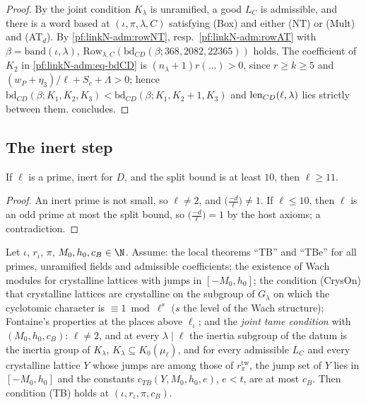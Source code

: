 \begin{proof}
By the joint condition $K_\lambda$ is unramified, a good $L_C$ is admissible, and there is a word based at
$(\iota,\pi,\lambda,C)$ satisfying (Box) and either (NT) or (Mult) and
(AT$_d$). By \cref{pf:linkN-adm:rowNT}, resp.\ \cref{pf:linkN-adm:rowAT} with
$\beta=\mathrm{band}(\iota,\lambda)$, $\mathrm{Row}_{\lambda,C}(\mathrm{bd}_{CD}(\beta;368,2082,22365))$ holds. The coefficient of
$K_2$ in \eqref{pf:linkN-adm:eq-bdCD} is $(n_\lambda+1)r(\dots)>0$, since $r\ge k\ge5$ and $(w_P+\eta_3)/\ell+S_c+\Lambda>0$;
hence $\mathrm{bd}_{CD}(\beta;K_1,K_2,K_3)<\mathrm{bd}_{CD}(\beta;K_1,K_2+1,K_3)$ and $\operatorname{len}_{CD}(\ell,\lambda)$ lies
strictly between them.  concludes.
\end{proof}

\subsection{The inert step}\label{pf:linkN-adm:inertsec}

\begin{lemma}\label{pf:linkN-adm:eleven}
If $\ell$ is a prime, inert for $D$, and the split bound is at least $10$, then $\ell\ge11$.
\end{lemma}

\begin{proof}
An inert prime is not small, so $\ell\ne2$, and $\bigl(\frac{-d}{\ell}\bigr)\ne1$. If $\ell\le10$, then $\ell$ is an odd
prime at most the split bound, so $\bigl(\frac{-d}{\ell}\bigr)=1$ by the host axioms; a contradiction.
\end{proof}

\begin{lemma}\label{pf:linkN-adm:TB}
Let $\iota$, $r_\iota$, $\pi$, $M_0,h_0,c_B\in\N$. Assume: the local theorems ``TB'' and ``TBe'' for all primes, unramified
fields and admissible coefficients; the existence of Wach modules for crystalline
lattices with jumps in $[-M_0,h_0]$; the condition (CrysOn) that crystalline lattices are crystalline on the subgroup of $G_\lambda$ on which the cyclotomic character is $\equiv1\bmod\ell^s$ ($s$ the level of the Wach structure); Fontaine's properties at
the places above $\ell_\iota$; and the \emph{joint tame condition} with $(M_0,h_0,c_B)$: $\ell\ne2$, and at every
$\lambda\mid\ell$ the inertia subgroup of the datum is the inertia group of $K_\lambda$, $K_\lambda\subseteq
K_0(\mu_\ell)$, and for every admissible $L_C$ and every crystalline lattice $Y$ whose jumps are among those of
$r^{\mathrm{tw}}_\pi$, the jump set of $Y$ lies in $[-M_0,h_0]$ and the constants $c_{TB}(Y,M_0,h_0,e)$, $e<t$, are at
most $c_B$. Then condition (TB) holds at $(\iota,r_\iota,\pi,c_B)$.
\end{lemma}

